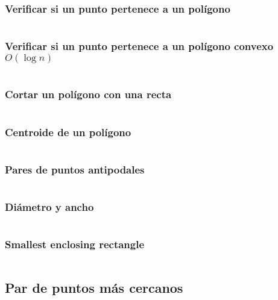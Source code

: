 \documentclass[11pt]{article}
\begin{document}
			\subsubsection{Verificar si un punto pertenece a un polígono}
			\inputminted[tabsize=2,breaklines,firstline=223,lastline=234,fontsize=\small]{c++}{geometry.cpp}
			
			\subsubsection{Verificar si un punto pertenece a un polígono convexo $O(\log n)$}
			\inputminted[tabsize=2,breaklines,firstline=559,lastline=586,fontsize=\small]{c++}{geometry.cpp}
			
			\subsubsection{Cortar un polígono con una recta}
			\inputminted[tabsize=2,breaklines,firstline=526,lastline=557,fontsize=\small]{c++}{geometry.cpp}
			
			\subsubsection{Centroide de un polígono}
			\inputminted[tabsize=2,breaklines,firstline=264,lastline=274,fontsize=\small]{c++}{geometry.cpp}
			
			\subsubsection{Pares de puntos antipodales}
			\inputminted[tabsize=2,breaklines,firstline=341,lastline=352,fontsize=\small]{c++}{geometry.cpp}
			
			\subsubsection{Diámetro y ancho}
			\inputminted[tabsize=2,breaklines,firstline=354,lastline=368,fontsize=\small]{c++}{geometry.cpp}
			
			\subsubsection{Smallest enclosing rectangle}
			\inputminted[tabsize=2,breaklines,firstline=370,lastline=389,fontsize=\small]{c++}{geometry.cpp}
		
		\subsection{Par de puntos más cercanos}
		\inputminted[tabsize=2,breaklines,firstline=236,lastline=262,fontsize=\small]{c++}{geometry.cpp}
		
\end{document}
